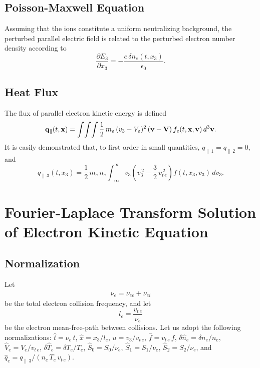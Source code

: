 \documentclass[12pt,prb,aps]{revtex4-1}
\begin{document}
\subsection{Poisson-Maxwell Equation}
Assuming that the ions constitute a uniform neutralizing background, the perturbed parallel electric field is related to the perturbed electron number
density according to
\begin{equation}\label{pois}
\frac{\partial  E_3}{\partial x_3}=-\frac{e\,\delta n_e(t,x_3)}{\epsilon_0}.
\end{equation}

\subsection{Heat Flux}
The flux of parallel electron kinetic energy is defined\,\cite{rf0}
\begin{equation}
{\bf q}_\parallel(t,{\bf x}) =  \int\!\int\!\int \frac{1}{2}\,m_e\,(v_3-V_e)^2\,({\bf v}-{\bf V})\,f_e(t,{\bf x},{\bf v})\,d^3{\bf v}.
\end{equation}
It is easily demonstrated that, to first order in small quantities, $q_{\parallel\,1}=q_{\parallel\,2}=0$, and
\begin{equation}\label{q3}
q_{\parallel\,3}(t,x_3) = \frac{1}{2}\,m_e\,n_e\int_{-\infty}^\infty v_3\left(v_3^{\,2}
-\frac{3}{2}\,v_{t\,e}^{\,2}\right)f(t,x_3,v_3)\,dv_3.
\end{equation}

\section{Fourier-Laplace Transform Solution of Electron Kinetic Equation}\label{s3}
\subsection{Normalization}
Let
\begin{align}\label{enu}
\nu_e= \nu_{ee}+\nu_{ei}
\end{align}
be the total electron collision frequency, and
let
\begin{equation}\label{el}
l_e= \frac{v_{t\,e}}{\nu_e}
\end{equation}
be the electron mean-free-path between collisions. 
Let us adopt the following normalizations: 
$\hat{t} = \nu_{e}\,t$,
$\hat{x}= x_3/l_e$,
$u = v_3/v_{t\,e}$,
$\hat{f}= v_{t\,e}\,f$,
$\delta\hat{n}_e= \delta n_e/n_e$,
$\hat{V}_e= V_e/v_{t\,e}$,
$\delta\hat{T}_e= \delta T_e/T_e$,
$\hat{S}_0 = S_0/\nu_{e}$,
$\hat{S}_1 = S_1/\nu_{e}$,
$\hat{S}_2= S_2/\nu_{e}$, and
$\hat{q}_e=q_{\parallel\,3}/(n_e\,T_e\,v_{t\,e})$.
 
\end{document}
